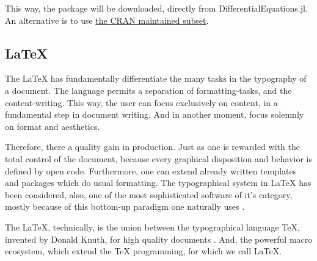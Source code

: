 \documentclass[
12pt,				%
openright,			%
oneside,			%
a4paper,			%
brazil,				%
english,			%
]{abntex2}
\begin{document}
This way, the package will be downloaded, directly from
DifferentialEquations.jl. An alternative is to use
\href{https://cran.r-project.org/web/packages/diffeqr/index.html}{the
  CRAN maintained subset}.

\subsection{\LaTeX}

The \LaTeX{} has fundamentally differentiate the many tasks in the
typography of a document. The language permits a separation of
formatting-tasks, and the content-writing. This way, the user can
focus exclusively on content, in a fundamental step in document
writing. And in another moment, focus solemnly on format and
aesthetics.

Therefore, there a quality gain in production. Just as one is rewarded
with the total control of the document, because every graphical
disposition and behavior is defined by open code. Furthermore, one can
extend already written templates and packages which do usual
formatting. The typographical system in \LaTeX{} has been considered,
also, one of the most sophisticated software of it's category, mostly
because of this bottom-up paradigm one naturally uses \cite{haralambous2007}.

The \LaTeX{}, technically, is the union between the typographical
language \TeX{}, invented by Donald Knuth, for high quality documents
\cite{knuth1986}. And, the powerful macro ecosystem, which extend the \TeX{}
programming, for which we call \LaTeX{}.
\end{document}
